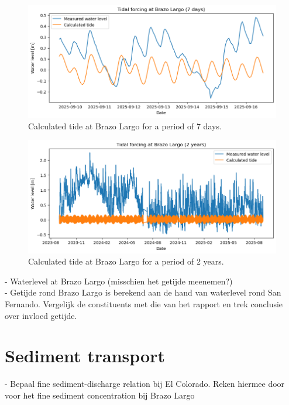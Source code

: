 \begin{figure}[H]
    \centering
    \includegraphics[width=1\linewidth]{figures/ch5/Tide_Brazo_largo.png}
    \caption{Calculated tide at Brazo Largo for a period of 7 days.}
    \label{fig:placeholder}
\end{figure}
\begin{figure}[H]
    \centering
    \includegraphics[width=1\linewidth]{figures/ch5/Tide_BL_2y.png}
    \caption{Calculated tide at Brazo Largo for a period of 2 years.}
    \label{fig:placeholder}
\end{figure}

- Waterlevel at Brazo Largo
    (misschien het getijde meenemen?)
\\ - Getijde rond Brazo Largo is berekend aan de hand van waterlevel rond San Fernando. Vergelijk de constituents met die van  het rapport en trek conclusie over invloed getijde.



\section{Sediment transport}




- Bepaal fine sediment-discharge relation bij El Colorado. Reken hiermee door voor het fine sediment concentration bij Brazo Largo

